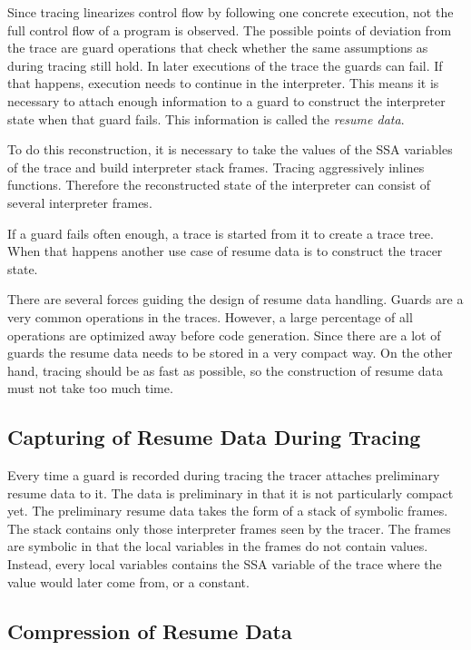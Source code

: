 \documentclass[10pt]{sigplanconf}
\begin{document}
Since tracing linearizes control flow by following one concrete execution,
not the full control flow of a program is observed.
The possible points of deviation from the trace are guard operations
that check whether the same assumptions as during tracing still hold.
In later executions of the trace the guards can fail.
If that happens, execution needs to continue in the interpreter.
This means it is necessary to attach enough information to a guard
to construct the interpreter state when that guard fails.
This information is called the \emph{resume data}.

To do this reconstruction, it is necessary to take the values
of the SSA variables of the trace
and build interpreter stack frames.
Tracing aggressively inlines functions.
Therefore the reconstructed state of the interpreter
can consist of several interpreter frames.

If a guard fails often enough, a trace is started from it
to create a trace tree.
When that happens another use case of resume data
is to construct the tracer state.

There are several forces guiding the design of resume data handling.
Guards are a very common operations in the traces.
However, a large percentage of all operations
are optimized away before code generation.
Since there are a lot of guards
the resume data needs to be stored in a very compact way.
On the other hand, tracing should be as fast as possible,
so the construction of resume data must not take too much time.

\subsection{Capturing of Resume Data During Tracing}
\label{sub:capturing}

Every time a guard is recorded during tracing
the tracer attaches preliminary resume data to it.
The data is preliminary in that it is not particularly compact yet.
The preliminary resume data takes the form of a stack of symbolic frames.
The stack contains only those interpreter frames seen by the tracer.
The frames are symbolic in that the local variables in the frames
do not contain values.
Instead, every local variables contains the SSA variable of the trace
where the value would later come from, or a constant.

\subsection{Compression of Resume Data}
\label{sub:compression}
\end{document}
